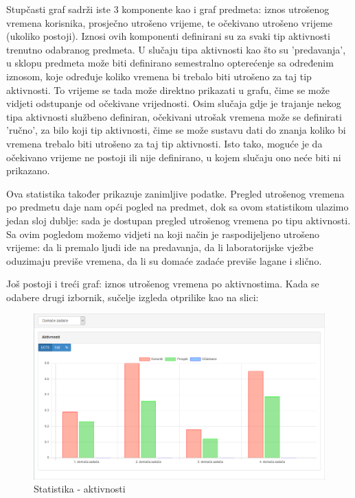 \documentclass[times, utf8, zavrsni, numeric]{fer}
\begin{document}
Stupčasti graf sadrži iste 3 komponente kao i graf predmeta: iznos utrošenog vremena korisnika, prosječno utrošeno vrijeme, te očekivano utrošeno vrijeme (ukoliko postoji). Iznosi ovih komponenti definirani su za svaki tip aktivnosti trenutno odabranog predmeta. U slučaju tipa aktivnosti kao što su 'predavanja', u sklopu predmeta može biti definirano semestralno opterećenje sa određenim iznosom, koje određuje koliko vremena bi trebalo biti utrošeno za taj tip aktivnosti. To vrijeme se tada može direktno prikazati u grafu, čime se može vidjeti odstupanje od očekivane vrijednosti. Osim slučaja gdje je trajanje nekog tipa aktivnosti službeno definiran, očekivani utrošak vremena može se definirati 'ručno', za bilo koji tip aktivnosti, čime se može sustavu dati do znanja koliko bi vremena trebalo biti utrošeno za taj tip aktivnosti. Isto tako, moguće je da očekivano vrijeme ne postoji ili nije definirano, u kojem slučaju ono neće biti ni prikazano.

Ova statistika također prikazuje zanimljive podatke. Pregled utrošenog vremena po predmetu daje nam opći pogled na predmet, dok sa ovom statistikom ulazimo jedan sloj dublje: sada je dostupan pregled utrošenog vremena po tipu aktivnosti. Sa ovim pogledom možemo vidjeti na koji način je raspodijeljeno utrošeno vrijeme: da li premalo ljudi ide na predavanja, da li laboratorijske vježbe oduzimaju previše vremena, da li su domaće zadaće previše lagane i slično.

Još postoji i treći graf: iznos utrošenog vremena po aktivnostima. Kada se odabere drugi izbornik, sučelje izgleda otprilike kao na slici:

\begin{figure}[H]
\centering
\includegraphics[width=\textwidth,height=\textheight,keepaspectratio]{img/statistika-aktivnosti.png}
\caption{Statistika - aktivnosti}
\label{fig:statistika-aktivnosti}
\end{figure}
\end{document}
